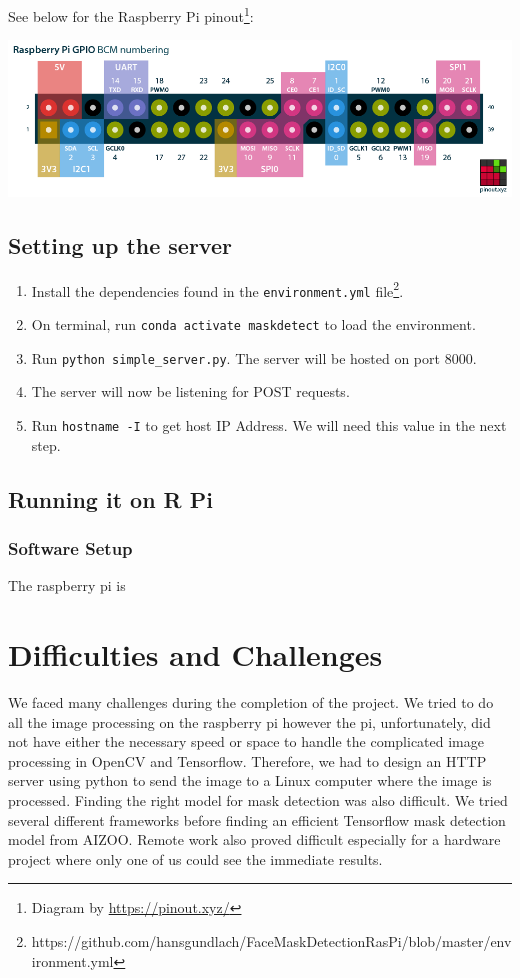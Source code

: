 \documentclass[conference, 12pt, onecolumn]{IEEEtran}
\begin{document}
See below for the Raspberry Pi pinout\footnote{Diagram by \url{https://pinout.xyz/}}:
\begin{center}
\includegraphics[scale=.5]{raspberry-pi-pinout}
\end{center}

\subsection{Setting up the server}
\begin{enumerate}
\item Install the dependencies found in the \texttt{environment.yml} file\footnote{https://github.com/hansgundlach/FaceMaskDetectionRasPi/blob/master/environment.yml}.
\item On terminal, run \texttt{conda activate maskdetect} to load the environment.
\item Run \texttt{python simple\_server.py}. The server will be hosted on port 8000.
\item The server will now be listening for POST requests.
\item Run \texttt{hostname -I} to get host IP Address. We will need this value in the next step.
\end{enumerate}

\subsection{Running it on R Pi}

\subsubsection{Software Setup}

The raspberry pi is 

\section{Difficulties and Challenges}
We faced many challenges during the completion of the project. We tried to do all the image processing on the raspberry pi however the pi, unfortunately, did not have either the necessary speed or space to handle the complicated image processing in OpenCV and Tensorflow. Therefore, we had to design an HTTP server using python to send the image to a Linux computer where the image is processed. Finding the right model for mask detection was also difficult. We tried several different frameworks before finding an efficient Tensorflow mask detection model from AIZOO. Remote work also proved difficult especially for a hardware project where only one of us could see the immediate results.
\end{document}
